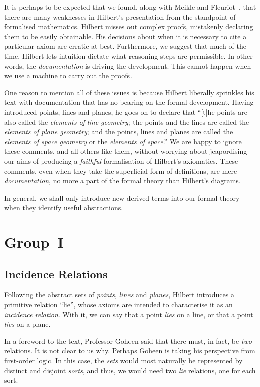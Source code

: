 It is perhaps to be expected that we found, along with Meikle and Fleuriot~\cite{MeikleFleuriotFormalizingHilbert}, that there are many weaknesses in Hilbert's presentation from the standpoint of formalised mathematics. Hilbert misses out complex proofs, mistakenly declaring them to be easily obtainable. His decisions about when it is necessary to cite a particular axiom are erratic at best. Furthermore, we suggest that much of the time, Hilbert lets intuition dictate what reasoning steps are permissible. In other words, the \emph{documentation} is driving the development. This cannot happen when we use a machine to carry out the proofs.

One reason to mention all of these issues is because Hilbert liberally sprinkles his text with documentation that has no bearing on the formal development. Having introduced points, lines and planes, he goes on to declare that ``[t]he points are also called the \emph{elements of line geometry}; the points and the lines are called the \emph{elements of plane geometry}; and the points, lines and planes are called the \emph{elements of space geometry} or the \emph{elements of space}.'' We are happy to ignore these comments, and all others like them, without worrying about jeapordising our aims of producing a \emph{faithful} formalisation of Hilbert's axiomatics. These comments, even when they take the superficial form of definitions, are mere \emph{documentation}, no more a part of the formal theory than Hilbert's diagrams. 

In general, we shall only introduce new derived terms into our formal theory when they identify useful abstractions.

\section{Group~I}
\subsection{Incidence Relations}
Following the abstract sets of \emph{points}, \emph{lines} and \emph{planes}, Hilbert introduces a primitive  relation ``lie'', whose axioms are intended to characterise it as an \emph{incidence relation}. With it, we can say that a point \emph{lies} on a line, or that a point \emph{lies} on a plane. 

In a foreword to the text, Professor Goheen said that there must, in fact, be \emph{two} relations. It is not clear to us why. Perhaps Goheen is taking his perspective from first-order logic. In this case, the \emph{sets} would most naturally be represented by distinct and disjoint \emph{sorts}, and thus, we would need two \emph{lie} relations, one for each sort. 

